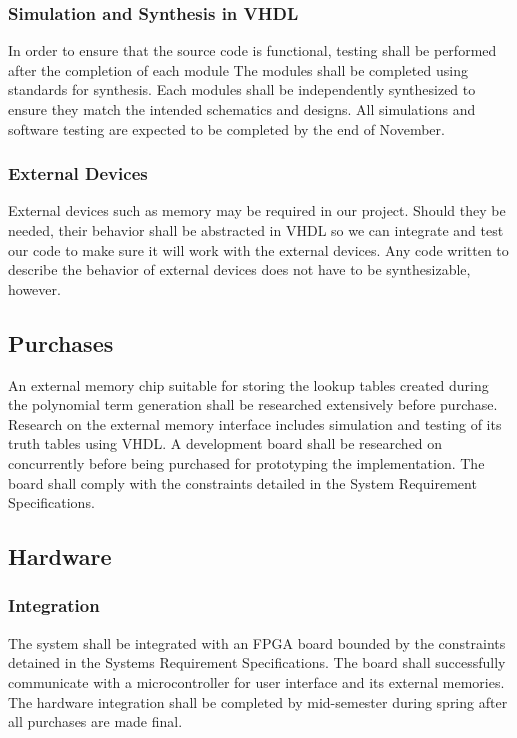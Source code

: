 \documentclass[paper=usletter, fontsize=12pt]{article}
\begin{document}
            \subsubsection{Simulation and Synthesis in VHDL}In order to ensure that the source code is functional, testing shall be performed after the completion of each module The modules shall be completed using standards for synthesis. Each modules shall be independently synthesized to ensure they match the intended schematics and designs. All simulations and software testing are expected to be completed by the end of November. 

            \subsubsection{External Devices}External devices such as memory may be required in our project. Should they be needed, their behavior shall be abstracted in VHDL so we can integrate and test our code to make sure it will work with the external devices. Any code written to describe the behavior of external devices does not have to be synthesizable, however. 

        \subsection{Purchases}An external memory chip suitable for storing the lookup tables created during the polynomial term generation shall be researched extensively before purchase. Research on the external memory interface includes simulation and testing of its truth tables using VHDL. A development board shall be researched on concurrently before being purchased for prototyping the implementation. The board shall comply with the constraints detailed in the System Requirement Specifications. 

        \subsection{Hardware}

            \subsubsection{Integration}The system shall be integrated with an FPGA board bounded by the constraints detained in the Systems Requirement Specifications. The board shall successfully communicate with a microcontroller for user interface and its external memories. The hardware integration shall be completed by mid-semester during spring after all purchases are made final.
\end{document}
